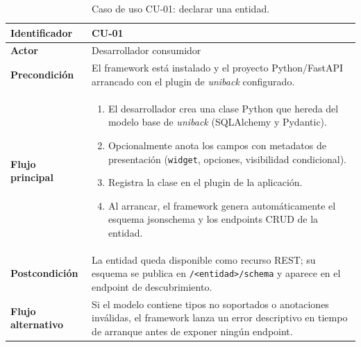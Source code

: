 \begin{table}[H]
\caption{Caso de uso CU-01: declarar una entidad.}
\label{tab:cu01}
\centering
\begin{tabular}{|l|p{9cm}|}
\hline
\textbf{Identificador} & CU-01 \\ \hline
\textbf{Actor} & Desarrollador consumidor \\ \hline
\textbf{Precondición} & El framework está instalado y el proyecto Python/FastAPI
arrancado con el plugin de \emph{uniback} configurado. \\ \hline
\textbf{Flujo principal} &
\begin{enumerate}
  \item El desarrollador crea una clase Python que hereda del modelo base de
        \emph{uniback} (SQLAlchemy y Pydantic).
  \item Opcionalmente anota los campos con metadatos de presentación
        (\texttt{widget}, opciones, visibilidad condicional).
  \item Registra la clase en el plugin de la aplicación.
  \item Al arrancar, el framework genera automáticamente el esquema
        \gls{jsonschema} y los endpoints CRUD de la entidad.
\end{enumerate} \\ \hline
\textbf{Postcondición} & La entidad queda disponible como recurso REST; su
esquema se publica en \texttt{/<entidad>/schema} y aparece en el endpoint
de descubrimiento. \\ \hline
\textbf{Flujo alternativo} & Si el modelo contiene tipos no soportados o
anotaciones inválidas, el framework lanza un error descriptivo en tiempo de
arranque antes de exponer ningún endpoint. \\ \hline
\end{tabular}
\end{table}

